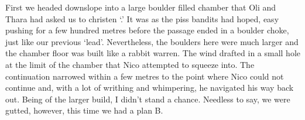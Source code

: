 First we headed downslope into a large boulder filled chamber that Oli
and Thara had asked us to christen `.' It was as the
piss bandits had hoped, easy pushing for a few hundred metres before the
passage ended in a boulder choke, just like our previous `lead'.
Nevertheless, the boulders here were much larger and the chamber floor
was built like a rabbit warren. The wind drafted in a small hole at the
limit of the chamber that Nico attempted to squeeze into. The
continuation narrowed within a few metres to the point where Nico could
not continue and, with a lot of writhing and whimpering, he navigated
his way back out. Being of the larger build, I didn't stand a chance.
Needless to say, we were gutted, however, this time we had a plan B.


    \begin{figure}[t!]
\checkoddpage \ifoddpage \forcerectofloat \else \forceversofloat \fi
\centering
\begin{subfigure}[t]{0.328\textwidth}
\centering
{}

\end{subfigure}
\end{figure}

